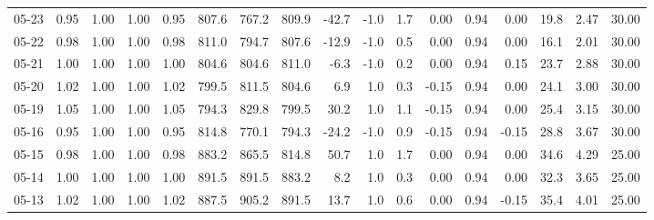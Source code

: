 \begin{threeparttable}
{\begin{tabular}{lrrrrrrrrrrrrrrrr}
  05-23 &         0.95 &           1.00 &          1.00 &          0.95 & 807.6 & 767.2 & 809.9 &      -42.7 &                     -1.0 &                 1.7 &       0.00 &      0.94 &           0.00 &             19.8 &            2.47 &                  30.00 \\
  05-22 &         0.98 &           1.00 &          1.00 &          0.98 & 811.0 & 794.7 & 807.6 &      -12.9 &                     -1.0 &                 0.5 &       0.00 &      0.94 &           0.00 &             16.1 &            2.01 &                  30.00 \\
  05-21 &         1.00 &           1.00 &          1.00 &          1.00 & 804.6 & 804.6 & 811.0 &       -6.3 &                     -1.0 &                 0.2 &       0.00 &      0.94 &           0.15 &             23.7 &            2.88 &                  30.00 \\
  05-20 &         1.02 &           1.00 &          1.00 &          1.02 & 799.5 & 811.5 & 804.6 &        6.9 &                      1.0 &                 0.3 &      -0.15 &      0.94 &           0.00 &             24.1 &            3.00 &                  30.00 \\
  05-19 &         1.05 &           1.00 &          1.00 &          1.05 & 794.3 & 829.8 & 799.5 &       30.2 &                      1.0 &                 1.1 &      -0.15 &      0.94 &           0.00 &             25.4 &            3.15 &                  30.00 \\
  05-16 &         0.95 &           1.00 &          1.00 &          0.95 & 814.8 & 770.1 & 794.3 &      -24.2 &                     -1.0 &                 0.9 &      -0.15 &      0.94 &          -0.15 &             28.8 &            3.67 &                  30.00 \\
  05-15 &         0.98 &           1.00 &          1.00 &          0.98 & 883.2 & 865.5 & 814.8 &       50.7 &                      1.0 &                 1.7 &       0.00 &      0.94 &           0.00 &             34.6 &            4.29 &                  25.00 \\
  05-14 &         1.00 &           1.00 &          1.00 &          1.00 & 891.5 & 891.5 & 883.2 &        8.2 &                      1.0 &                 0.3 &       0.00 &      0.94 &           0.00 &             32.3 &            3.65 &                  25.00 \\
  05-13 &         1.02 &           1.00 &          1.00 &          1.02 & 887.5 & 905.2 & 891.5 &       13.7 &                      1.0 &                 0.6 &       0.00 &      0.94 &          -0.15 &             35.4 &            4.01 &                  25.00 \\

\end{tabular}}
\end{threeparttable}
